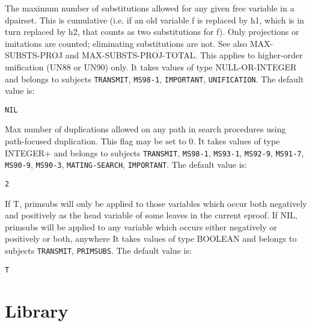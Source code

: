 \begin{description}
\item[MAX-SUBSTS-VAR]  
The maximum number of substitutions allowed for any given
free variable in a dpairset. This is cumulative (i.e. if an old 
variable f is replaced by h1, which is in turn replaced by h2,
that counts as two substitutions for f). Only projections or
imitations are counted; eliminating substitutions are not.
See also MAX-SUBSTS-PROJ and MAX-SUBSTS-PROJ-TOTAL.
This applies to higher-order unification (UN88 or UN90) only.
It takes values of type NULL-OR-INTEGER and belongs to subjects \texttt{TRANSMIT}, \texttt{MS98-1}, \texttt{IMPORTANT}, \texttt{UNIFICATION}.  The default value is: \begin{lstlisting}
NIL
\end{lstlisting}

\item[NUM-OF-DUPS]  
Max number of duplications allowed on any path in 
    search procedures using path-focused duplication.
    This flag may be set to 0.
It takes values of type INTEGER+ and belongs to subjects \texttt{TRANSMIT}, \texttt{MS98-1}, \texttt{MS93-1}, \texttt{MS92-9}, \texttt{MS91-7}, \texttt{MS90-9}, \texttt{MS90-3}, \texttt{MATING-SEARCH}, \texttt{IMPORTANT}.  The default value is: \begin{lstlisting}
2
\end{lstlisting}

\item[PRIMSUB-VAR-SELECT]  
If T, primsubs will only be applied to those variables
which occur both negatively and positively as the head variable
of some leaves in the current eproof.
If NIL, primsubs will be applied to any variable which occurs
either negatively or positively or both, anywhere
It takes values of type BOOLEAN and belongs to subjects \texttt{TRANSMIT}, \texttt{PRIMSUBS}.  The default value is: \begin{lstlisting}
T
\end{lstlisting}

\item
\end{description}

\section{Library}

